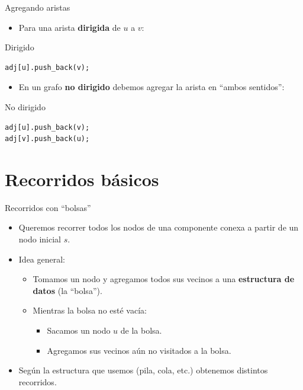 \documentclass[aspectratio=169]{beamer}
\begin{document}
\begin{frame}[fragile]{Agregando aristas}
  \begin{itemize}
    \item Para una arista \textbf{dirigida} de \(u\) a \(v\):
  \end{itemize}
  \begin{block}{Dirigido}
  \begin{lstlisting}[style=customc]
adj[u].push_back(v);
  \end{lstlisting}
  \end{block}
  \begin{itemize}
    \item En un grafo \textbf{no dirigido} debemos agregar la arista en ``ambos sentidos'':
  \end{itemize}
  \begin{block}{No dirigido}
  \begin{lstlisting}[style=customc]
adj[u].push_back(v);
adj[v].push_back(u);
  \end{lstlisting}
  \end{block}
\end{frame}

\section{Recorridos básicos}

\begin{frame}{Recorridos con ``bolsas''}
  \begin{itemize}
    \item Queremos recorrer todos los nodos de una componente conexa a partir de un nodo inicial \(s\).
    \item Idea general:
      \begin{itemize}
        \item Tomamos un nodo y agregamos todos sus vecinos a una \textbf{estructura de datos} (la ``bolsa'').
        \item Mientras la bolsa no esté vacía:
          \begin{itemize}
            \item Sacamos un nodo \(u\) de la bolsa.
            \item Agregamos sus vecinos aún no visitados a la bolsa.
          \end{itemize}
      \end{itemize}
    \item Según la estructura que usemos (pila, cola, etc.) obtenemos distintos recorridos.
  \end{itemize}
\end{frame}
\end{document}

